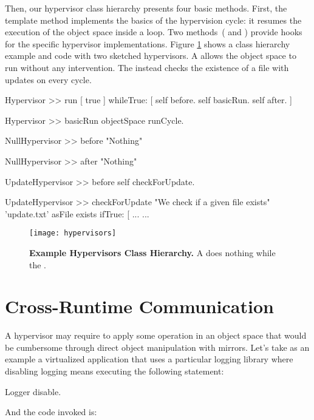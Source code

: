 Then, our hypervisor class hierarchy presents four basic methods. First, the  template method implements the basics of the hypervision cycle: it resumes the execution of the object space inside a loop. Two methods~( and ) provide hooks for the specific hypervisor implementations. Figure \ref{fig:hypervisors} shows a class hierarchy example and code with two sketched hypervisors. A  allows the object space to run without any intervention. The  instead checks the existence of a file with updates on every cycle.

\begin{code}
Hypervisor >> run
    [ true ] whileTrue: [
        self before.
        self basicRun.
        self after.
    ]

Hypervisor >> basicRun
    objectSpace runCycle.

NullHypervisor >> before
    "Nothing"

NullHypervisor >> after
    "Nothing"

UpdateHypervisor >> before
    self checkForUpdate.

UpdateHypervisor >> checkForUpdate
    "We check if a given file exists"
    'update.txt' asFile exists ifTrue: [ ...
    ...
\end{code}

\begin{figure}[ht]
\center
\texttt{[image: hypervisors]}
\caption{\textbf{Example Hypervisors Class Hierarchy.} A  does nothing while the .\label{fig:hypervisors}}
\end{figure}

\section{Cross-Runtime Communication} \label{sec:communication}\label{sec:isolation}

A hypervisor may require to apply some operation in an object space that would be cumbersome through direct object manipulation with mirrors. Let's take as an example a virtualized application that uses a particular logging library where disabling logging means executing the following statement:

\begin{code}
Logger disable.
\end{code}

And the code invoked is:

